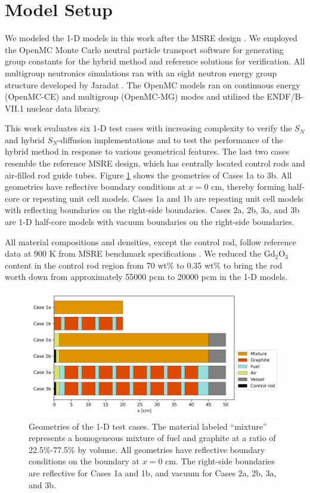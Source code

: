 \documentclass[letterpaper]{mc2025}
\begin{document}
\section{Model Setup}

We modeled the 1-D models in this work after the \gls{MSRE} design \cite{robertson_msre_1965}. We
employed the OpenMC Monte
Carlo neutral particle transport software \cite{romano_openmc:_2015} for generating group constants
for the hybrid method and reference solutions for verification. All multigroup
neutronics simulations ran with an eight neutron energy group structure developed by Jaradat
\cite{jaradat_development_2021-1}. The OpenMC models ran on continuous energy (OpenMC-CE) and
multigroup (OpenMC-MG) modes and utilized the ENDF/B-VII.1 nuclear data library.

This work evaluates six 1-D test cases with increasing complexity to verify the $S_N$ and hybrid
$S_N$-diffusion implementations and to test the performance of the hybrid
method in response to various geometrical features. The last two cases resemble the
reference \gls{MSRE} design, which has centrally located control rods
and air-filled rod guide tubes. Figure \ref{fig:case-geom} shows the geometries of Cases 1a to
3b. All geometries have reflective boundary conditions at $x=0$ cm, thereby
forming half-core or repeating unit cell models. Cases 1a and 1b are repeating unit
cell models with reflecting boundaries on the right-side boundaries. Cases 2a, 2b, 3a, and 3b
are 1-D half-core models with vacuum boundaries on the right-side boundaries.

All material compositions and densities, except the control rod, follow
reference data at 900 K from \gls{MSRE} benchmark specifications \cite{fratoni_molten_2020}.
We reduced the Gd$_2$O$_3$ content in the control rod region from 70 wt\% to 0.35 wt\% to bring the
rod worth down from approximately 55000 pcm to 20000 pcm in the 1-D models.
%
\begin{figure}[htb!]
  \centering
  \includegraphics[width=0.8\columnwidth]{case-geometry}
  \caption{Geometries of the 1-D test cases. The material labeled ``mixture'' represents a
    homogeneous mixture of fuel and graphite at a ratio of 22.5\%-77.5\% by volume. All geometries
    have reflective boundary conditions on the boundary at $x=0$ cm. The right-side boundaries are
    reflective for Cases 1a and 1b, and vacuum for Cases 2a, 2b, 3a, and 3b.}
  \label{fig:case-geom}
\end{figure}
\end{document}
